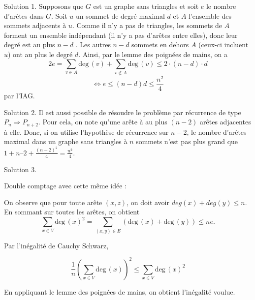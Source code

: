 \begin{sol}

Solution 1. Supposons que $G$ est un graphe sans triangles et soit $e$ le nombre d’arêtes dans $G$. Soit $u$ un sommet de degré maximal $d$ et $A$ l'ensemble des sommets adjacents à
$u$. Comme il n'y a pas de triangles, les sommets de $A$ forment un ensemble indépendant (il
n'y a pas d'arêtes entre elles), donc leur degré est au plus $n-d$ . Les autres $n-d$ sommets
en dehors $A$ (ceux-ci incluent $ u$) ont au plus le degré $d$. Ainsi, par le lemme des poignées de mains,
on a 
$$ 2e = \sum_{v \in A} \mathrm{deg}\, (v) + \sum_{v \notin A} \mathrm{deg}\, (v)\leq 2\cdot (n-d) \cdot d $$
$$ \Leftrightarrow e \leq (n-d)d \leq \frac{n^2}{4}$$
 par l’IAG.



Solution 2.
Il est aussi possible de résoudre le problème par récurrence de type $P_n \Rightarrow P_{n+2}$.
Pour cela, on note qu’une arête à au plus $(n-2)$ arêtes adjacentes à elle.
Donc, si on utilise l’hypothèse de récurrence sur $n-2$, le nombre d’arêtes maximal dans un graphe sans triangles à $n$ sommets n’est pas plus grand que $1+n – 2 + \frac{(n-2)^2}{4}= \frac{n^2}{4}$.


Solution 3.

Double comptage avec cette même idée :

On observe que pour toute arête $(x,z)$, on doit avoir $deg(x) + deg(y) \leq n$.
En sommant sur toutes les arêtes, on obtient 
$$ \sum_{x \in V} \mathrm{deg}\,(x)^2 = \sum_{(x,y) \in E} (\mathrm{deg}\,(x) + \mathrm{deg}\,(y)) \leq ne.$$

Par l’inégalité de Cauchy Schwarz,

$$ \frac{1}{n} \left( \sum_{x \in V} \mathrm{deg}\,(x) \right) ^2 \leq \sum_{x \in V} \mathrm{deg}\,(x)^2$$

En appliquant le lemme des poignées de mains, on obtient l’inégalité voulue.\\

\end{sol}

